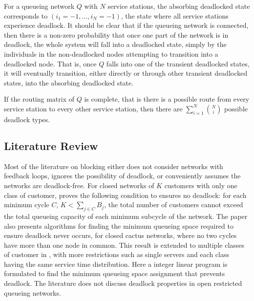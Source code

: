 \documentclass{article}
\begin{document}
For a queueing network $Q$ with $N$ service stations, the absorbing deadlocked state corresponds to $(i_1=-1,...,i_N=-1)$, the state where all service stations experience deadlock.
It should be clear that if the queueing network is connected, then there is a non-zero probability that once one part of the network is in deadlock, the whole system will fall into a deadlocked state, simply by the individuals in the non-deadlocked nodes attempting to transition into a deadlocked node.
That is, once $Q$ falls into one of the transient deadlocked states, it will eventually transition, either directly or through other transient deadlocked states, into the absorbing deadlocked state.

If the routing matrix of $Q$ is complete, that is there is a possible route from every service station to every other service station, then there are $\sum_{i=1}^N \binom{N}{i}$ possible deadlock types.

\subsection{Literature Review}

Most of the literature on blocking either does not consider networks with feedback loops, ignores the possibility of deadlock, or conveniently assumes the networks are
deadlock-free.
For closed networks of $K$ customers with only one class of customer, \cite{kunduakyildiz89} proves the following condition to ensures no deadlock: for each minimum cycle $C$, $K < \sum_{j\in C} B_j$, the total number of customers cannot exceed the total queueing capacity of each minimum subcycle of the network.
The paper also presents algorithms for finding the minimum queueing space required to ensure deadlock never occurs, for closed cactus networks, where no two cycles have more than one node in common.
This result is extended to multiple classes of customer in \cite{liebeherrakyildiz95}, with more restrictions such as single servers and each class having the same service time distribution.
Here a integer linear program is formulated to find the minimum queueing space assignment that prevents deadlock.
The literature does not discuss deadlock properties in open restricted queueing networks.
\end{document}
